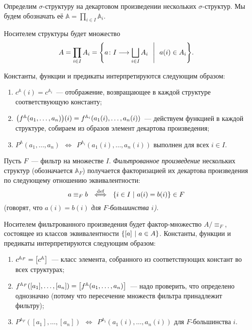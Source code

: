 \begin{definition}
	Определим \(\sigma\)-структуру на декартовом произведении нескольких \(\sigma\)-структур. Мы будем обозначать её \(\mathbb{A} = \prod_{i \in I} \mathbb{A}_i\).
    
	Носителем структуры будет множество
	   \[ A = \prod\limits_{i \in I} A_i =
	      \set*{a \colon I \longrightarrow \bigsqcup\limits_{i \in I} A_i
	      \ \ \middle\vert\ \ a(i) \in A_i}.\]

	Константы, функции и предикаты интерпретируются следующим образом:
   \begin{enumerate}
	\item \(c^{\mathbb{A}}(i) = c^{\mathbb{A}_i}\)~— отображение, возвращающее в каждой структуре соответствующую константу;
	\item \( \lr*{f^{\mathbb{A}}(a_1, \ldots, a_n)}(i) =
	          f^{\mathbb{A}_i}(a_1(i), \ldots, a_n(i)) \)~— действуем функцией в каждой структуре, собираем из образов элемент декартова произведения;
	\item \(P^{\mathbb{A}}(a_1, \ldots, a_n)\ \ \Longleftrightarrow\ \ 
	        P^{\mathbb{A}_i}(a_1(i), \ldots, a_n(i))\text{\ выполнен для всех\ }i \in I\).
   \end{enumerate}
\end{definition}

\begin{definition}
    Пусть $F$~— фильтр на множестве $I$. \emph{Фильтрованное произведение} нескольких структур (обозначается $\mathbb{A}_F$) получается факторизацией их декартова произведения по следующему отношению эквивалентности:
	\[a \equiv_F b\ \ \overset{\text{def}}{\Longleftrightarrow}\ \ 
	  \set*{i \in I\ \middle\vert\ a(i) = b(i)} \in F\]    
    (говорят, что $a(i) = b(i)$ \emph{для $F$-большинства $i$).}

    Носителем фильтрованного произведения будет фактор-множество \(A / {\equiv_F}\), состоящее из классов эквивалентности \(\set*{ \segment*{a}\ \middle\vert\ a \in A}\). Константы, функции и предикаты интерпретируются следующим образом:
    \begin{enumerate}
	\item $c^{\mathbb{A}_F} = \segment*{c^{\mathbb{A}}}$~— класс элемента, собранного из соответствующих констант во всех структурах;
	\item $f^{\mathbb{A}_F}\lr*{[a_1], \ldots, [a_n]} =
	      \segment*{f^{\mathbb{A}}\lr*{a_1, \ldots, a_n}}$~— надо проверить, что определено однозначно (потому что пересечение множеств фильтра принадлежит фильтру); 
	\item $P^{\mathbb{A}_F}([a_1], \ldots, [a_n])\ \ \Longleftrightarrow\ \ 
	       P^{\mathbb{A}_i} (a_1(i), \ldots, a_n(i))$ для $F$-большинства $i$. 
    \end{enumerate}
\end{definition} 

